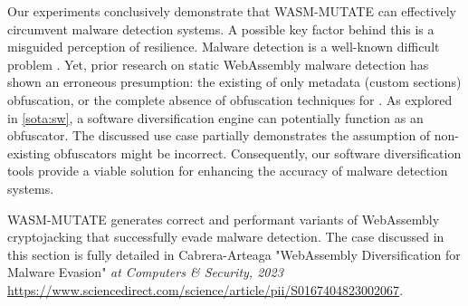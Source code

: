 

\begin{tcolorbox}[title=Reflection,boxrule=1pt,arc=.2em,boxsep=1.0mm]
    Our experiments conclusively demonstrate that WASM-MUTATE can effectively circumvent malware detection systems. 
    A possible key factor behind this is a misguided perception of resilience. 
    Malware detection is a well-known difficult problem \cite{cohen1987computer}. 
    Yet, prior research on static WebAssembly malware detection has shown an erroneous presumption: the existing of only metadata (\Wasm custom sections) obfuscation, or the complete absence of obfuscation techniques for \Wasm \cite{Minesweeper, MinerRay, SEISMIC, RAPID, MINOS}. 
    As explored in \autoref{sota:sw}, a software diversification engine can potentially function as an obfuscator. %
    The discussed use case partially demonstrates the assumption of non-existing obfuscators might be incorrect. 
    Consequently, our software diversification tools provide a viable solution for enhancing the accuracy of \Wasm malware detection systems.

\end{tcolorbox}


\begin{tcolorbox}[title=Contribution paper,boxrule=1pt,arc=.2em,boxsep=1.0mm]
    WASM-MUTATE generates correct and performant variants of WebAssembly cryptojacking that successfully evade malware detection.
    The case discussed in this section is fully detailed in Cabrera-Arteaga \etal "WebAssembly Diversification for Malware Evasion"
    \emph{at Computers \& Security, 2023}
    \url{https://www.sciencedirect.com/science/article/pii/S0167404823002067}. 
\end{tcolorbox}


